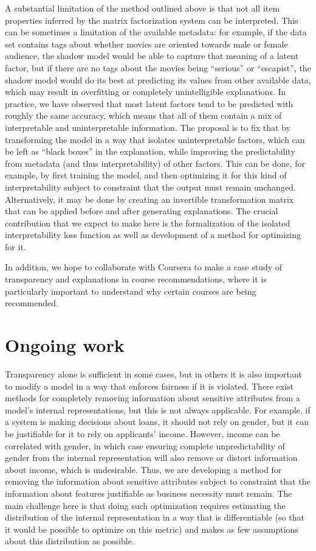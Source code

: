 A substantial limitation of the method outlined above is that not all
item properties inferred by the matrix factorization system can be interpreted.
This can be sometimes a limitation of the available metadata: for example,
if the data set contains tags about whether movies are oriented towards male or
female audience, the shadow model would be able to capture that meaning of a
latent factor, but if there are no tags about the movies being ``serious'' or
``escapist'', the shadow model would do its best at predicting its values from
other available data, which may result in overfitting or completely
unintelligible explanations. In practice, we have observed that most latent
factors tend to be predicted with roughly the same accuracy, which means that
all of them contain a mix of interpretable and uninterpretable information. The
proposal is to fix that by transforming the model in a way that isolates
uninterpretable factors, which can be left as ``black boxes'' in the
explanation, while improving the predictability from metadata (and thus
interpretability) of other factors. This can be done, for example, by first
training the model, and then optimizing it for this kind of interpretability
subject to constraint that the output must remain unchanged. Alternatively, it
may be done by creating an invertible transformation matrix that can be applied
before and after generating explanations. The crucial contribution that we
expect to make here is the formalization of the isolated interpretability loss
function as well as development of a method for optimizing for it.

In addition, we hope to collaborate with Coursera to make a case study of
transparency and explanations in course recommendations, where it is
particularly important to understand why certain courses are being recommended.

\section{Ongoing work}

Transparency alone is sufficient in some cases, but in others it is also
important to modify a model in a way that enforces fairness if it is violated.
There exist methods for completely removing information about sensitive
attributes from a model's internal representations\cite{Beutel2017DataDA}, but
this is not always applicable. For example, if a system is making decisions
about loans, it should not rely on gender, but it can be justifiable for it to
rely on applicants' income. However, income can be correlated with gender, in
which case ensuring complete unpredictability of gender from the internal
representation will also remove or distort information about income, which is
undesirable. Thus, we are developing a method for removing the information
about sensitive attributes subject to constraint that the information about
features justifiable as business necessity must remain. The main challenge here
is that doing such optimization requires estimating the distribution of the
internal representation in a way that is differentiable (so that it would be
possible to optimize on this metric) and makes as few assumptions about this
distribution as possible.

